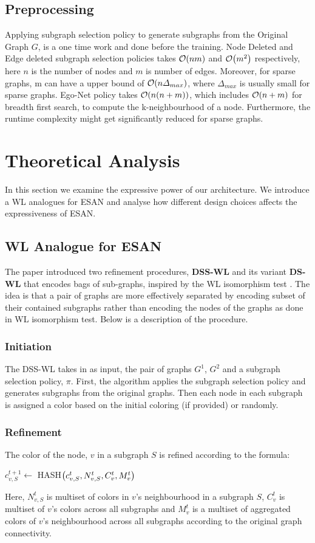 \documentclass[11pt, dvipsnames, DIV=12]{scrreprt}
\let\originalleft\left
\let\originalright\right
\renewcommand{\left}{\mathopen{}\mathclose\bgroup\originalleft}
\renewcommand{\right}{\aftergroup\egroup\originalright}
\theoremstyle{definition}
\begin{document}
\subsection{Preprocessing}
Applying subgraph selection policy to generate subgraphs from the Original Graph $G$, is a one time work and done before the training. Node Deleted and Edge deleted subgraph selection policies takes $\mathcal{O}\left(nm\right)$ and $\mathcal{O}\left(m^2\right)$ respectively, here $n$ is the number of nodes and $m$ is number of edges. Moreover, for sparse graphs, m can have a upper bound of $\mathcal{O}\left(n\Delta_{max}\right)$, where $\Delta_{max}$ is usually small for sparse graphs. Ego-Net policy takes $\mathcal{O}\left(n\left(n+m\right)\right)$, which includes $\mathcal{O}\left(n+m\right)$ for breadth first search, to compute the k-neighbourhood of a node. Furthermore, the runtime complexity might get significantly reduced for sparse graphs.
\section{Theoretical Analysis}
In this section we examine the expressive power of our architecture. We introduce a WL analogues for ESAN and analyse how different design choices affects the expressiveness of ESAN.
\subsection{WL Analogue for ESAN}
The paper introduced two refinement procedures, \textbf{DSS-WL} and its variant \textbf{DS-WL} that encodes bags of sub-graphs, inspired by the WL isomorphism test \citep{weisfeiler_1968}. The idea is that a pair of graphs are more effectively separated by encoding subset of their contained subgraphs rather than encoding the nodes of the graphs as done in WL isomorphism test.
Below is a description of the procedure.
\subsubsection{Initiation} The DSS-WL takes in as input, the pair of graphs $G^1$, $G^2$ and a subgraph selection policy, $\pi$. First, the algorithm applies the subgraph selection policy and generates subgraphs from the original graphs. Then each node in each subgraph is assigned a color based on the initial coloring (if provided) or randomly.
\subsubsection{Refinement} The color of the node, $v$ in a subgraph $S$ is refined according to the formula$\colon$
\begin{center}
    $c_{v,S}^{t+1} \leftarrow$ HASH$\left(c_{v,S}^t,N^t_{v,S},C^t_v,M^t_v\right)$ 
\end{center}
Here, $N^t_{v,S}$ is multiset of colors in $v$'s neighbourhood in a subgraph $S$, $C^t_v$ is multiset of $v$'s colors across all subgraphs and $M^t_v$ is a multiset of aggregated colors of $v$'s neighbourhood across all subgraphs according to the original graph connectivity.
\end{document}
